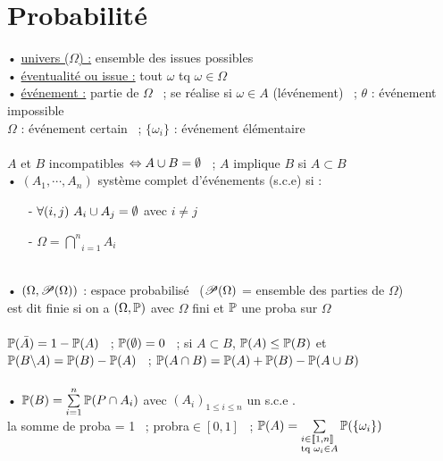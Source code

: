 \documentclass[12 pt]{book}
\begin{document}
\section*{Probabilité}

\begin{flushleft}
\begin{doublespace}

	• \underline{univers ($\Omega$) :} ensemble des issues possibles\\
	• \underline{éventualité ou issue :} tout $\omega$ tq $\omega\in\Omega$\\
	• \underline{ événement :} partie de $\Omega$ \ ; se réalise si $\omega\in A$ (lévénement) \ ; $\theta$ : événement impossible\\
	$\Omega$ : événement certain \ ; $\{\omega_i\}$ : événement élémentaire\\
	\text{ }\\
	$A$ et $B$ incompatibles $\Leftrightarrow A\cup B = \emptyset$ \ ; $A$ implique $B$ si $A\subset B$\\
	• $(A_1,\cdots,A_n)$ système complet d'événements (s.c.e) si :
	\begin{itemize}
		\item[-] $\forall (i,j) \ A_i \cup A_j = \emptyset$ avec $i \ne j$
		\item[-] $\Omega = \underset{i = 1}{\overset{n}{\bigcap}} A_i$
	\end{itemize}

	\text{ }\\
	• $(\Omega , \mathscr{P}(\Omega))$ : espace probabilisé \ ($\mathscr{P}(\Omega)$ = ensemble des parties de $\Omega$)\\
	\quad est dit finie si on a $(\Omega, \mathbb{P})$ avec $\Omega$ fini et $\mathbb{P}$ une proba sur $\Omega$\\
	
	\text{ }\\
	$\mathbb{P}(\bar{A}) = 1 - \mathbb{P}(A)$ \ ; $\mathbb{P}(\emptyset) = 0$ \ ; si $A \subset B$, $\mathbb{P}(A) \leq \mathbb{P}(B)$ et $\mathbb{P}(B\backslash A) = \mathbb{P}(B) - \mathbb{P}(A)$ \ ; $\mathbb{P}(A \cap B) = \mathbb{P}(A) + \mathbb{P}(B) - \mathbb{P}(A\cup B)$\\
	
	\text{ }\\
	• $ \mathbb{P}(B) = \sum\limits_{i = 1}^n \mathbb{P}(P \cap A_i)$ avec $(A_i)_{1\leq i \leq n}$ un s.c.e .\\
	la somme de proba = 1 \ ; probra$\in [0, 1]$ \ ; $\mathbb{P}(A) =\sum\limits_{\begin{subarray}{l} i\in \llbracket 1,n \rrbracket \\ \text{tq } \omega_i\in A \end{subarray}} \mathbb{P}(\{\omega_i\})$\\
	

\end{doublespace}
\end{flushleft}
\end{document}
